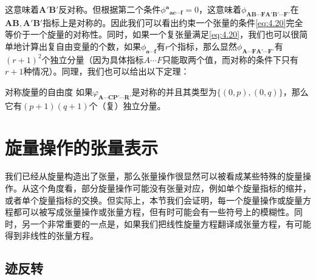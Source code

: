 这意味着$\boldsymbol{A} '\boldsymbol{B} '$反对称。但根据第二个条件$\phi ^{\boldsymbol{a}}{}_{\boldsymbol{ac} \cdots \boldsymbol{f}} =0$，这意味着$\phi _{\boldsymbol{AB} \cdots \boldsymbol{FA} '\boldsymbol{B} '\cdots \boldsymbol{F} '}$在$\boldsymbol{AB} ,\boldsymbol{A} '\boldsymbol{B} '$指标上是对称的。因此我们可以看出约束一个张量的条件\ref{eq:4.20}完全等价于一个旋量的对称性。同时，如果一个复张量满足\ref{eq:4.20}，我们也可以很简单地计算出复自由变量的个数，如果$\phi _{\boldsymbol{a} \cdots \boldsymbol{f}}$有$r$个指标，那么显然$\phi _{\boldsymbol{A} \cdots \boldsymbol{FA} '\cdots \boldsymbol{F} '}$有$( r+1)^{2}$个独立分量（因为具体指标$A\cdots F$只能取两个值，而对称的条件下只有$r+1$种情况）。同理，我们也可以给出以下定理：

\begin{them}[label={dof of symmetric spinor}]{对称旋量的自由度}
	如果$\varphi _{\boldsymbol{A} \cdots \boldsymbol{CP} '\cdots \boldsymbol{R} '}$是对称的并且其类型为$\{( 0,p) ,( 0,q)\}$，那么它有$( p+1)( q+1)$个（复）独立分量。
\end{them}


\section{旋量操作的张量表示}

我们已经从旋量构造出了张量，那么张量操作很显然可以被看成某些特殊的旋量操作。从这个角度看，部分旋量操作可能没有张量对应，例如单个旋量指标的缩并，或者单个旋量指标的交换。但实际上，本节我们会证明，每一个旋量操作或旋量方程都可以被写成张量操作或张量方程，但有时可能会有一些符号上的模糊性。同时，另一个非常重要的一点是，如果我们把线性旋量方程翻译成张量方程，有可能得到非线性的张量方程。


\subsection{迹反转}

